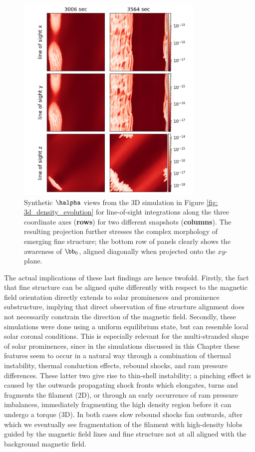 \begin{figure}[t]
  \centering
  \includegraphics[width=0.8\textwidth]{3d_synthetic_views.png}
  \caption{
    Synthetic $\halpha$ views from the 3D simulation in Figure \ref{fig: 3d_density_evolution} for line-of-sight integrations along the three coordinate axes (\textbf{rows}) for two different snapshots (\textbf{columns}). The resulting projection further stresses the complex morphology of emerging fine structure; the bottom row of panels clearly shows the awareness of $\bb_0$, aligned diagonally when projected onto the $xy$-plane.
  }
  \label{fig: 3d_synthetic_views}
\end{figure}

The actual implications of these last findings are hence twofold. Firstly, the fact that fine structure can be aligned quite differently with respect to the magnetic field orientation directly extends to solar prominences and prominence substructure, implying that direct observation of fine structure alignment does not necessarily constrain the direction of the magnetic field. Secondly, these simulations were done using a uniform equilibrium state, but can resemble local solar coronal conditions. This is especially relevant for the multi-stranded shape of solar prominences, since in the simulations discussed in this Chapter these features seem to occur in a natural way through a combination of thermal instability, thermal conduction effects, rebound shocks, and ram pressure differences. These latter two give rise to thin-shell instability; a pinching effect is caused by the outwards propagating shock fronts which elongates, turns and fragments the filament (2D), or through an early occurrence of ram pressure imbalances, immediately fragmenting the high density region before it can undergo a torque (3D). In both cases slow rebound shocks fan outwards, after which we eventually see fragmentation of the filament with high-density blobs guided by the magnetic field lines and fine structure not at all aligned with the background magnetic field.


